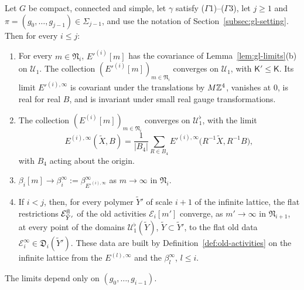 \begin{theorem}\label{thm:gen-locality}
Let $G$ be compact, connected and simple, let $\gamma$ satisfy ($\Gamma$1)--($\Gamma$3), let $j\ge1$ and $\pi=(g_0,\dots,g_{j-1})\in\Sigma_{j-1}$, and use the notation of Section~\ref{subsec:gl-setting}. Then for every $i\le j$:
\begin{enumerate}[label=(\alph*)]
\item For every $m\in\mathfrak N_i$, $E'^{(i)}[m]$ has the covariance of Lemma~\ref{lem:gl-limits}(b) on $\mathcal U_1$. The collection $(E'^{(i)}[m])_{m\in\mathfrak N_i}$ converges on $\mathcal U_1$, with $\mathsf K'\le\mathsf K$. Its limit $E'^{(i),\infty}$ is covariant under the translations by $M\mathbb Z^4$, vanishes at $0$, is real for real $B$, and is invariant under small real gauge transformations.
\item The collection $(E^{(i)}[m])_{m\in\mathfrak N_i}$ converges on $\mathcal U^\flat_1$, with the limit
\[
E^{(i),\infty}(\tilde X,B)=\frac1{|B_4|}\sum_{R\in B_4}E'^{(i),\infty}\big(R^{-1}\tilde X,R^{-1}B\big),
\]
with $B_4$ acting about the origin.
\item $\beta_i[m]\to\beta^\infty_i:=\beta^\infty_{E'^{(i),\infty}}$ as $m\to\infty$ in $\mathfrak N_i$.
\item If $i<j$, then, for every polymer $\tilde Y'$ of scale $i+1$ of the infinite lattice, the flat restrictions $\mathcal E^{\rm fl}_{\tilde Y'}$ of the old activities $\mathcal E_i[m']$ converge, as $m'\to\infty$ in $\mathfrak N_{i+1}$, at every point of the domains $\mathcal U^\flat_1(\tilde Y)$, $\tilde Y\subset\tilde Y'$, to the flat old data $\mathcal E^\infty_i\in\mathfrak D_i(\tilde Y')$. These data are built by Definition~\ref{def:old-activities} on the infinite lattice from the $E^{(l),\infty}$ and the $\beta^\infty_l$, $l\le i$.
\end{enumerate}
The limits depend only on $(g_0,\dots,g_{i-1})$.
\end{theorem}

